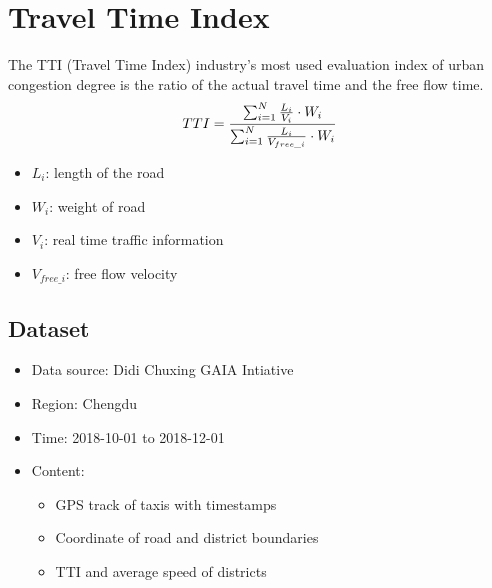 \documentclass[fontset=none]{ctexart}
\theoremstyle{definition}
\theoremstyle{remark}
\begin{document}
\clearpage
\section{Travel Time Index}
The TTI (Travel Time Index) industry's most used evaluation index of urban congestion degree is the ratio of the actual travel time and the free flow time.
\begin{equation}
  TTI=\frac{\sum_{i=1}^N\frac{L_i}{V_i}\cdot W_i}{\sum_{i=1}^N\frac{L_i}{V_{free\_i}}\cdot W_i} \notag
\end{equation}
\begin{itemize}
  \item $L_i$: length of the road
  \item $W_i$: weight of road
  \item $V_i$: real time traffic information
  \item $V_{free\_i}$: free flow velocity
\end{itemize}

\subsection{Dataset}
\begin{itemize}
    \item Data source: Didi Chuxing GAIA Intiative
    \item Region: Chengdu
    \item Time: 2018-10-01 to 2018-12-01
    \item Content:
        \begin{itemize}
            \item GPS track of taxis with timestamps
            \item Coordinate of road and district boundaries
            \item TTI and average speed of districts
        \end{itemize}
\end{itemize}

\clearpage
\end{document}
